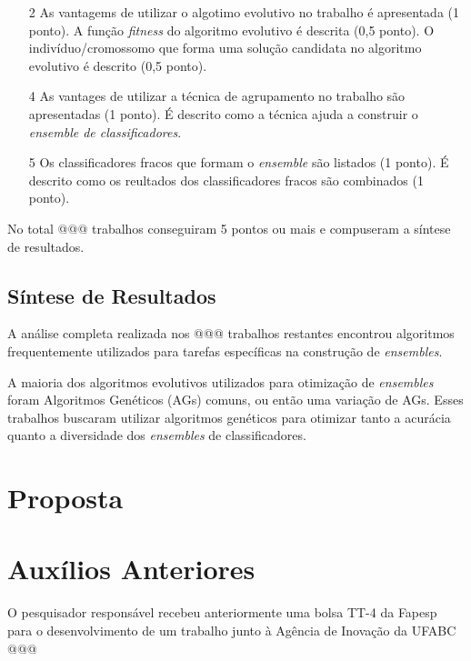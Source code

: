 \documentclass[12pt]{report}
\begin{document}
\begin{enumerate}
  \item[2] As vantagems de utilizar o algotimo evolutivo no trabalho é apresentada (1 ponto). A função \textit{fitness} do algoritmo evolutivo é descrita (0,5 ponto). O indivíduo/cromossomo que forma uma solução candidata no algoritmo evolutivo é descrito (0,5 ponto).
  \item[4] As vantages de utilizar a técnica de agrupamento no trabalho são apresentadas (1 ponto). É descrito como a técnica ajuda a construir o \textit{ensemble de classificadores}.
  \item[5] Os classificadores fracos que formam o \textit{ensemble} são listados (1 ponto). É descrito como os reultados dos classificadores fracos são combinados (1 ponto).
\end{enumerate}

No total @@@ trabalhos conseguiram 5 pontos ou mais e compuseram a síntese de resultados.

\section{Síntese de Resultados} \label{sec:sintese_de_resultados}

A análise completa realizada nos @@@ trabalhos restantes encontrou algoritmos frequentemente utilizados para tarefas específicas na construção de \textit{ensembles}.

A maioria dos algoritmos evolutivos utilizados para otimização de \textit{ensembles} foram Algoritmos Genéticos (AGs) comuns, ou então uma variação de AGs. Esses trabalhos buscaram utilizar algoritmos genéticos para otimizar tanto a acurácia quanto a diversidade dos \textit{ensembles} de classificadores.





\chapter{Proposta}




\chapter{Auxílios Anteriores}

O pesquisador responsável recebeu anteriormente uma bolsa TT-4 da Fapesp para o desenvolvimento de um trabalho junto à Agência de Inovação da UFABC @@@ 





\end{document}
